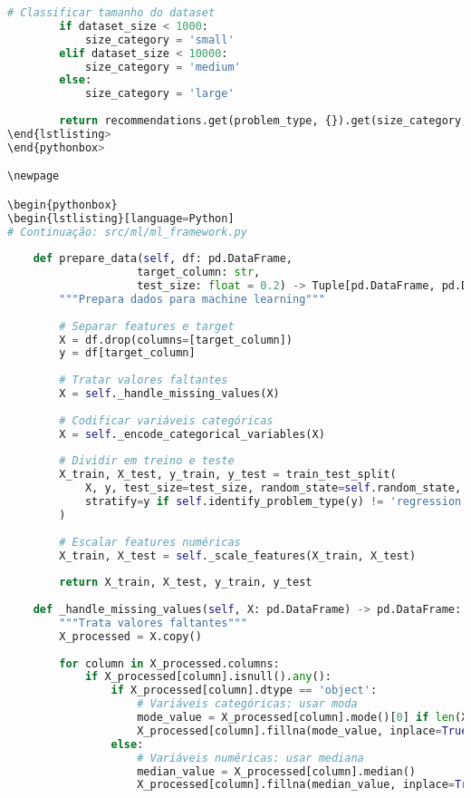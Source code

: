 \begin{pythonbox}
\begin{lstlisting}[language=Python]
        # Classificar tamanho do dataset
        if dataset_size < 1000:
            size_category = 'small'
        elif dataset_size < 10000:
            size_category = 'medium'
        else:
            size_category = 'large'
            
        return recommendations.get(problem_type, {}).get(size_category, ['random_forest'])
\end{lstlisting>
\end{pythonbox>

\newpage

\begin{pythonbox}
\begin{lstlisting}[language=Python]
# Continuação: src/ml/ml_framework.py
    
    def prepare_data(self, df: pd.DataFrame, 
                    target_column: str,
                    test_size: float = 0.2) -> Tuple[pd.DataFrame, pd.DataFrame, pd.Series, pd.Series]:
        """Prepara dados para machine learning"""
        
        # Separar features e target
        X = df.drop(columns=[target_column])
        y = df[target_column]
        
        # Tratar valores faltantes
        X = self._handle_missing_values(X)
        
        # Codificar variáveis categóricas
        X = self._encode_categorical_variables(X)
        
        # Dividir em treino e teste
        X_train, X_test, y_train, y_test = train_test_split(
            X, y, test_size=test_size, random_state=self.random_state,
            stratify=y if self.identify_problem_type(y) != 'regression' else None
        )
        
        # Escalar features numéricas
        X_train, X_test = self._scale_features(X_train, X_test)
        
        return X_train, X_test, y_train, y_test
    
    def _handle_missing_values(self, X: pd.DataFrame) -> pd.DataFrame:
        """Trata valores faltantes"""
        X_processed = X.copy()
        
        for column in X_processed.columns:
            if X_processed[column].isnull().any():
                if X_processed[column].dtype == 'object':
                    # Variáveis categóricas: usar moda
                    mode_value = X_processed[column].mode()[0] if len(X_processed[column].mode()) > 0 else 'Unknown'
                    X_processed[column].fillna(mode_value, inplace=True)
                else:
                    # Variáveis numéricas: usar mediana
                    median_value = X_processed[column].median()
                    X_processed[column].fillna(median_value, inplace=True)
        

\end{lstlisting}
\end{pythonbox}
